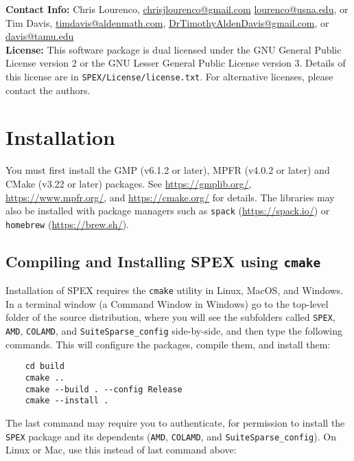 \documentclass[12pt,oneside]{book}
\theoremstyle{definition}
\begin{document}
\noindent \textbf{Contact Info:} Chris Lourenco,
\href{mailto:chrisjlourenco@gmail.com}{chrisjlourenco@gmail.com} \href{mailto:lourenco@usna.edu}{lourenco@usna.edu}, or Tim Davis,
\href{mailto:timdavis@aldenmath.com}{timdavis@aldenmath.com},
\href{DrTimothyAldenDavis@gmail.com}{DrTimothyAldenDavis@gmail.com}, or \href{mailto:davis@tamu.edu}{davis@tamu.edu}\\

\noindent \textbf{License:} This software package is dual licensed under the GNU General Public License version 2 or the GNU Lesser General Public License version 3. Details of this license are in \verb|SPEX/License/license.txt|. For alternative licenses, please contact the authors.


\section{Installation} \label{s:util:install}
You must first install the GMP (v6.1.2 or later), MPFR (v4.0.2 or later) and CMake
(v3.22 or later) packages.
See \url{https://gmplib.org/}, \url{https://www.mpfr.org/}, and \url{https://cmake.org/}
for details.  
The libraries may also be installed with package
managers such as \verb'spack' (\url{https://spack.io/}) or \verb'homebrew' (\url{https://brew.sh/}).

\subsection{Compiling and Installing SPEX using {\tt cmake}}

Installation of SPEX requires the \verb|cmake| utility in Linux, MacOS, and Windows.
In a terminal window (a Command Window in Windows) go to the top-level folder of the
source distribution, where you will see the subfolders called \verb'SPEX', \verb'AMD',
\verb'COLAMD', and \verb'SuiteSparse_config' side-by-side, and then type the following
commands.  This will configure the packages, compile them, and install them:

\begin{verbatim}
    cd build
    cmake ..
    cmake --build . --config Release
    cmake --install .
\end{verbatim}

The last command may require you to authenticate, for permission to install the \verb'SPEX'
package and its dependents (\verb'AMD', \verb'COLAMD', and \verb'SuiteSparse_config').
On Linux or Mac, use this instead of last command above:
\end{document}
